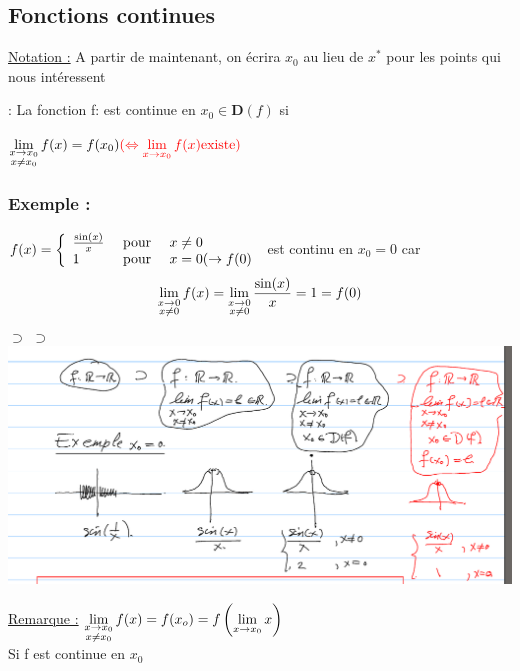 \documentclass[12pt,a4paper]{article}
\begin{document}
{\subsection{Fonctions continues}
\underline{Notation :} A partir de maintenant, on écrira $x_ 0$ au lieu de $x^*$ pour les points qui nous intéressent\\
\begin{boite}
\Definition : La fonction f: \rtor est continue en $x_0 \in \mathbf{D}(f)$ si 

$\lim\limits_{\substack{x \to x_0 \\ x \neq x_0}} f(x) = f(x_0) \textcolor{red}{(\Leftrightarrow \lim\limits_{x \to x_0} f(x) \mbox{existe})}$
\end{boite}
\subsubsection{Exemple :}
$f(x) = 
\left\{
\begin{array}{lll}
\frac{\sin(x)}{x} & \mbox{ pour } & x \neq 0\\
1 & \mbox{ pour } & x = 0 (\to f(0) 
\end{array}
\right.$
est continu en $x_0 = 0$ car \begin{equation}
\lim\limits_{\substack{x\to 0 \\ x \neq 0}} f(x) = \lim\limits_{\substack{x\to 0 \\ x \neq 0}} \frac{\sin(x)}{x} = 1 = f(0)
\end{equation}
 $\supset$ $ \supset$\\
\includegraphics[scale=0.5]{illustrations_Analyse/nakwa}

\begin{boite}
\underline{Remarque :} $\lim\limits_{\substack{x \to x_0 \\ x \neq x_0}}f(x) = f(x_o) = f\left(\lim\limits_{x \to x_0}x\right)$\\
Si f est continue en $x_0$
\end{boite}

}
\end{document}
